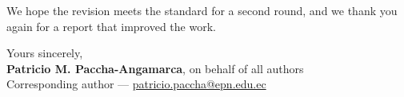 \documentclass[11pt,a4paper]{article}
\begin{document}
\vspace{8pt}
\noindent We hope the revision meets the standard for a second round, and we thank you again for a report that improved the work.

\vspace{14pt}
\noindent Yours sincerely,\\[16pt]
\textbf{Patricio M. Paccha-Angamarca}, on behalf of all authors\\
Corresponding author --- \href{mailto:patricio.paccha@epn.edu.ec}{patricio.paccha@epn.edu.ec}
\end{document}
